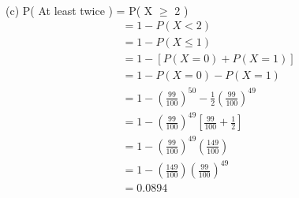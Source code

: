 \documentclass[journal,12pt,twocolumn]{IEEEtran}
\begin{document}
\\
(c) P( At least twice ) = P( X $\geq$ 2 )\\
\begin{align*} 
&= 1-P( X < 2 )\\
&= 1-P( X \leq 1 )\\
&= 1 - [P(X=0) + P(X=1)]\\
&= 1 - P(X=0) - P(X=1)\\
&= 1 - (\frac{99}{100})^{50} -\frac{1}{2}(\frac{99}{100})^{49}\\
&= 1 - (\frac{99}{100})^{49} [\frac{99}{100}+\frac{1}{2}]\\
&= 1 - (\frac{99}{100})^{49}(\frac{149}{100})\\
&= 1 -(\frac{149}{100})(\frac{99}{100})^{49}\\
&= 0.0894
\end{align*}
\end{document}
